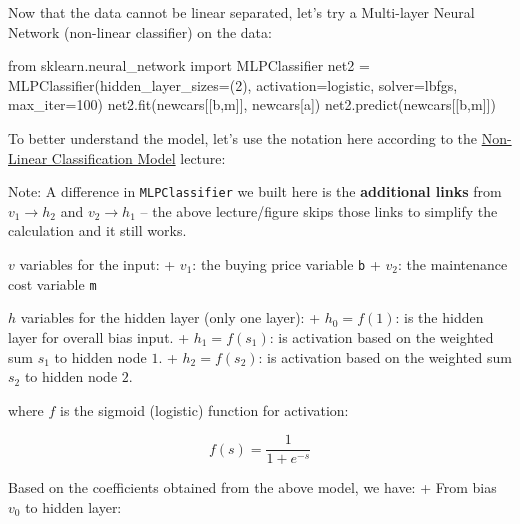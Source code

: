 \documentclass[
  letterpaper,
]{scrbook}
\newenvironment{Shaded}{\begin{snugshade}}{\end{snugshade}}
\newcommand{\DecValTok}[1]{\textcolor[rgb]{0.68,0.00,0.00}{#1}}
\newcommand{\ImportTok}[1]{\textcolor[rgb]{0.00,0.46,0.62}{#1}}
\newcommand{\NormalTok}[1]{\textcolor[rgb]{0.00,0.23,0.31}{#1}}
\newcommand{\OperatorTok}[1]{\textcolor[rgb]{0.37,0.37,0.37}{#1}}
\newcommand{\StringTok}[1]{\textcolor[rgb]{0.13,0.47,0.30}{#1}}
\begin{document}
Now that the data cannot be linear separated, let's try a Multi-layer
Neural Network (non-linear classifier) on the data:

\begin{Shaded}
\begin{Highlighting}[]
\ImportTok{from}\NormalTok{ sklearn.neural\_network }\ImportTok{import}\NormalTok{ MLPClassifier}
\NormalTok{net2 }\OperatorTok{=}\NormalTok{ MLPClassifier(hidden\_layer\_sizes}\OperatorTok{=}\NormalTok{(}\DecValTok{2}\NormalTok{), activation}\OperatorTok{=}\StringTok{\textquotesingle{}logistic\textquotesingle{}}\NormalTok{, }
\NormalTok{                     solver}\OperatorTok{=}\StringTok{\textquotesingle{}lbfgs\textquotesingle{}}\NormalTok{, max\_iter}\OperatorTok{=}\DecValTok{100}\NormalTok{)}
\NormalTok{net2.fit(newcars[[}\StringTok{\textquotesingle{}b\textquotesingle{}}\NormalTok{,}\StringTok{\textquotesingle{}m\textquotesingle{}}\NormalTok{]], newcars[}\StringTok{\textquotesingle{}a\textquotesingle{}}\NormalTok{])}
\NormalTok{net2.predict(newcars[[}\StringTok{\textquotesingle{}b\textquotesingle{}}\NormalTok{,}\StringTok{\textquotesingle{}m\textquotesingle{}}\NormalTok{]])}
\end{Highlighting}
\end{Shaded}

To better understand the model, let's use the notation here according to
the \href{../models/nonlinear_class.html}{Non-Linear Classification
Model} lecture:

Note: A difference in \texttt{MLPClassifier} we built here is the
\textbf{additional links} from \(v_1 \to h_2\) and \(v_2 \to h_1\) --
the above lecture/figure skips those links to simplify the calculation
and it still works.

\(v\) variables for the input: + \(v_1\): the buying price variable
\texttt{b} + \(v_2\): the maintenance cost variable \texttt{m}

\(h\) variables for the hidden layer (only one layer): + \(h_0 = f(1)\):
is the hidden layer for overall bias input. + \(h_1 = f(s_1)\): is
activation based on the weighted sum \(s_1\) to hidden node \(1\). +
\(h_2 = f(s_2)\): is activation based on the weighted sum \(s_2\) to
hidden node \(2\).

where \(f\) is the sigmoid (logistic) function for activation:

\[ f(s) = \frac{1}{1 + e^{-s}}\]

Based on the coefficients obtained from the above model, we have: + From
bias \(v_0\) to hidden layer:
\end{document}
